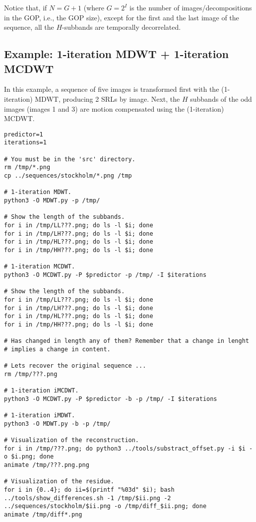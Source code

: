 Notice that, if $N=G+1$ (where $G=2^I$ is the number of
images/decompositions in the GOP, i.e., the GOP size), except for the
first and the last image of the sequence, all the $H$-subbands are
temporally decorrelated.

\subsection*{Example: 1-iteration MDWT + 1-iteration MCDWT}
In this example, a sequence of five images is transformed first with
the (1-iteration) MDWT, producing 2 SRLs by image. Next, the $H$
subbands of the odd images (images 1 and 3) are motion compensated
using the (1-iteration) MCDWT.

\begin{verbatim}
predictor=1
iterations=1

# You must be in the 'src' directory.
rm /tmp/*.png
cp ../sequences/stockholm/*.png /tmp

# 1-iteration MDWT.
python3 -O MDWT.py -p /tmp/

# Show the length of the subbands.
for i in /tmp/LL???.png; do ls -l $i; done
for i in /tmp/LH???.png; do ls -l $i; done
for i in /tmp/HL???.png; do ls -l $i; done
for i in /tmp/HH???.png; do ls -l $i; done

# 1-iteration MCDWT.
python3 -O MCDWT.py -P $predictor -p /tmp/ -I $iterations

# Show the length of the subbands.
for i in /tmp/LL???.png; do ls -l $i; done
for i in /tmp/LH???.png; do ls -l $i; done
for i in /tmp/HL???.png; do ls -l $i; done
for i in /tmp/HH???.png; do ls -l $i; done

# Has changed in length any of them? Remember that a change in lenght
# implies a change in content.

# Lets recover the original sequence ...
rm /tmp/???.png

# 1-iteration iMCDWT.
python3 -O MCDWT.py -P $predictor -b -p /tmp/ -I $iterations

# 1-iteration iMDWT.
python3 -O MDWT.py -b -p /tmp/

# Visualization of the reconstruction.
for i in /tmp/???.png; do python3 ../tools/substract_offset.py -i $i -o $i.png; done
animate /tmp/???.png.png

# Visualization of the residue.
for i in {0..4}; do ii=$(printf "%03d" $i); bash ../tools/show_differences.sh -1 /tmp/$ii.png -2 ../sequences/stockholm/$ii.png -o /tmp/diff_$ii.png; done
animate /tmp/diff*.png
\end{verbatim}

